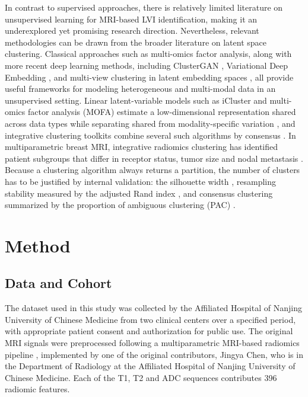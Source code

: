 \documentclass[conference]{IEEEtran}
\begin{document}
In contrast to supervised approaches, there is relatively limited literature on unsupervised learning for MRI-based LVI identification, making it an underexplored yet promising research direction. Nevertheless, relevant methodologies can be drawn from the broader literature on latent space clustering. Classical approaches such as multi-omics factor analysis, along with more recent deep learning methods, including ClusterGAN \cite{mukherjee2019clustergan}, Variational Deep Embedding \cite{jiang2016variational}, and multi-view clustering in latent embedding spaces \cite{chen2020multi}, all provide useful frameworks for modeling heterogeneous and multi-modal data in an unsupervised setting.
Linear latent-variable models such as iCluster and multi-omics factor analysis (MOFA) estimate a low-dimensional representation shared across data types while separating shared from modality-specific variation \cite{shen2009icluster,argelaguet2018mofa,argelaguet2020mofaplus}, and integrative clustering toolkits combine several such algorithms by consensus \cite{lu2020movics}. In multiparametric breast MRI, integrative radiomics clustering has identified patient subgroups that differ in receptor status, tumor size and nodal metastasis \cite{he2024integrative}. Because a clustering algorithm always returns a partition, the number of clusters has to be justified by internal validation: the silhouette width \cite{rousseeuw1987silhouettes}, resampling stability measured by the adjusted Rand index \cite{hubert1985comparing}, and consensus clustering summarized by the proportion of ambiguous clustering (PAC) \cite{monti2003consensus,senbabaoglu2014critical}.

\section{Method}
\subsection{Data and Cohort}

The dataset used in this study was collected by the Affiliated Hospital of Nanjing University of Chinese Medicine from two clinical centers over a specified period, with appropriate patient consent and authorization for public use. The original MRI signals were preprocessed following a multiparametric MRI-based radiomics pipeline \cite{cao2024multiparameter}, implemented by one of the original contributors, Jingya Chen, who is in the Department of Radiology at the Affiliated Hospital of Nanjing University of Chinese Medicine. Each of the T1, T2 and ADC sequences contributes 396 radiomic features.
\end{document}
